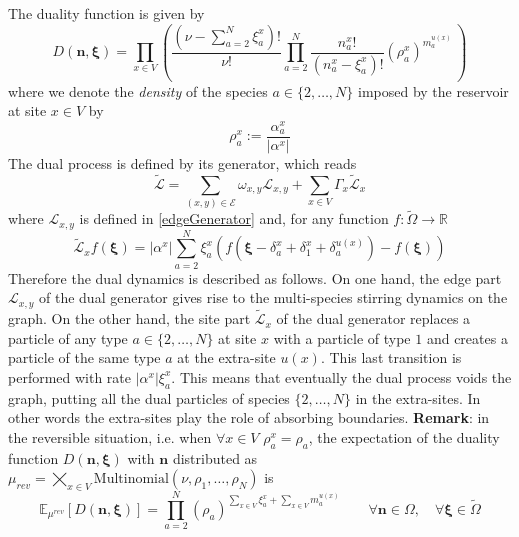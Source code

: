 \documentclass[11pt]{article}
\numberwithin{equation}{section}
\numberwithin{equation}{subsection}
\newcommand{\twoj}{\nu}
\begin{document}
The duality function is given by
\begin{equation}\label{dualityElements}
	D(\bm{n},\bm{\xi})=\prod_{x\in V}\left(\frac{(\nu -\sum_{a=2}^{N}\xi_{a}^{x})!}{\nu!}\prod_{a=2}^{N}\frac{n_{a}^{x}!}{(n_{a}^{x}-\xi_{a}^{x})!}\left(\rho_{a}^{x}\right)^{m_{a}^{u(x)}}\,\right)
\end{equation}
where we denote the \textit{density} of the species $a\in \{2,\ldots,N\}$ imposed by the reservoir at site $x\in V$  by 
\begin{equation}
\rho_{a}^{x}:=\frac{\alpha_{a}^{x}}{|\alpha^{x}|}
\end{equation}
The dual process is defined by its generator, which reads
 \begin{equation}\label{DualGenerator}
    \widetilde{\mathcal{L}}=\sum_{(x,y)\in \mathcal{E}}\omega_{x,y}\mathcal{L}_{x,y}+\sum_{x\in V}\Gamma_{x}\widetilde{\mathcal{L}}_{x}
\end{equation}
where 
$\mathcal{L}_{x,y}$ is defined in \eqref{edgeGenerator} and, for any function $f:\widetilde{\Omega}\to \mathbb{R}$ 
\begin{equation}\label{siteDualGenerator}
    \widetilde{\mathcal{L}}_{x}f(\bm{\xi})=|\alpha^{x}|\sum_{a=2}^{N}\xi_{a}^{x}\left(f(\bm{\xi}-\delta_{a}^{x}+\delta_{1}^{x}+\delta_{a}^{u(x)})-f(\bm{\xi})\right)
\end{equation}
\newline
Therefore the dual dynamics is described as follows. On one hand, the edge part $\mathcal{L}_{x,y}$ of the dual generator gives rise to  the multi-species stirring dynamics on the graph. On the other hand, the site
part $\widetilde{\mathcal{L}}_{x}$ of the dual generator replaces a particle of any type $a\in\{2,\ldots,N\}$ at site $x$ with a particle of type $1$ and creates a particle of the same type $a$ at the extra-site $u(x)$. This last transition is performed with rate $|\alpha^{x}|\xi_{a}^{x}$. This means that eventually the dual process voids the graph, putting all the dual particles of species $\{2,\ldots,N\}$ in the extra-sites. In other words the extra-sites play the role of absorbing boundaries. 
\newline \newline
\textbf{Remark}: in the reversible situation, i.e. when $\forall x\in V$ $\rho_{a}^{x}=\rho_{a}$, the expectation  of the duality function  $D(\bm{n},\bm{\xi})$ with   $\bm{n}$ distributed as  $\mu_{rev} = \bigtimes_{x\in V}\text{Multinomial}\left(\twoj, \rho_{1},\ldots,\rho_{N}\right)$ is
\begin{equation}
\mathbb{E}_{\mu^{rev}}\left[D(\bm{n},\bm{\xi})\right]=\prod_{a=2}^{N}\left(\rho_{a}\right)^{\sum_{x\in V}\xi_{a}^{x}+\sum_{x\in V}m_{a}^{u(x)}}\qquad \forall \bm{n}\in \Omega,\quad\forall \bm{\xi}\in \widetilde{\Omega}
\end{equation}
\end{document}
